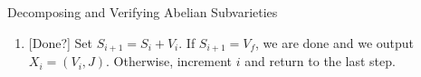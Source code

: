 \begin{algorithm}{Decomposing and Verifying Abelian Subvarieties}
\begin{enumerate}
\begin{enumerate}
                    Pick some $x\in V_f\setminus S_i$. Use Algorithm~\ref{} to
                    determine if there exists $V_i$ such that $x\in V_i$, where
                    $V_i$ is the image of an integral linear combination of
                    $\delta_j:A_f ^\vee \to J_0(N)$. If not, then $V_f$ does
                    not correspond to an abelian subvariety and we are done.
                \item{} [Done?]
                    Set $S_{i+1} = S_i + V_i$. If $S_{i+1}=V_f$, we are done
                    and we output $X_i=(V_i, J)$. Otherwise, increment $i$ and
                    return to the last step.
            \end{enumerate}
    \end{enumerate}
\end{algorithm}

